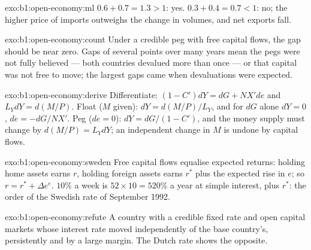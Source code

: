 \begin{solution}{exo:b1:open-economy:ml}
$0.6 + 0.7 = 1.3 > 1$: yes. $0.3 + 0.4 = 0.7 < 1$: no; the higher price of imports
outweighs the change in volumes, and net exports fall.
\end{solution}

\begin{solution}{exo:b1:open-economy:count}
Under a credible peg with free capital flows, the gap should be near zero.
Gaps of several points over many years mean the pegs were not fully
believed --- both countries devalued more than once --- or that capital
was not free to move; the largest gaps came when devaluations were
expected.
\end{solution}

\begin{solution}{exo:b1:open-economy:derive}
Differentiate: $(1 - C')dY = dG + NX'de$ and $L_Y dY = d(M/P)$. Float ($M$ given): $dY = d(M/P)/L_Y$, and
for $dG$ alone $dY = 0$, $de = -dG/NX'$. Peg ($de = 0$): $dY = dG/(1 - C')$, and the money supply must
change by $d(M/P) = L_Y dY$; an independent change in $M$ is undone by capital flows.
\end{solution}

\begin{solution}{exo:b1:open-economy:sweden}
Free capital flows equalise expected returns: holding home assets earns $r$,
holding foreign assets earns $r^*$ plus the expected rise in $e$; so $r = r^* + \Delta e^e$.
$10\%$ a week is $52 \times 10 = 520\%$ a year at simple interest, plus $r^*$: the order of the
Swedish rate of September 1992.
\end{solution}

\begin{solution}{exo:b1:open-economy:refute}
A country with a credible fixed rate and open capital markets whose
interest rate moved independently of the base country's, persistently and
by a large margin. The Dutch rate shows the opposite.
\end{solution}

